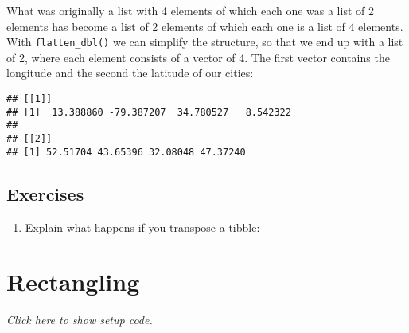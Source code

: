 \documentclass[]{book}
\newenvironment{Shaded}{\begin{snugshade}}{\end{snugshade}}
\newcommand{\KeywordTok}[1]{\textcolor[rgb]{0.13,0.29,0.53}{\textbf{#1}}}
\newcommand{\NormalTok}[1]{#1}
\newcommand{\OperatorTok}[1]{\textcolor[rgb]{0.81,0.36,0.00}{\textbf{#1}}}
\newcommand{\StringTok}[1]{\textcolor[rgb]{0.31,0.60,0.02}{#1}}
\begin{document}
What was originally a list with 4 elements of which each one was a list of 2 elements has become a list of 2 elements of which each one is a list of 4 elements.
With \texttt{flatten\_dbl()} we can simplify the structure, so that we end up with a list of 2, where each element consists of a vector of 4.
The first vector contains the longitude and the second the latitude of our cities:

\begin{Shaded}
\end{Shaded}

\begin{verbatim}
## [[1]]
## [1]  13.388860 -79.387207  34.780527   8.542322
## 
## [[2]]
## [1] 52.51704 43.65396 32.08048 47.37240
\end{verbatim}

\hypertarget{exercises-22}{%
\subsection{Exercises}\label{exercises-22}}

\begin{enumerate}
\def\labelenumi{\arabic{enumi}.}
\item
  Explain what happens if you transpose a tibble:

\begin{Shaded}
\end{Shaded}
\end{enumerate}

\hypertarget{rectangulate}{%
\section{Rectangling}\label{rectangulate}}

\emph{Click here to show setup code.}
\end{document}
